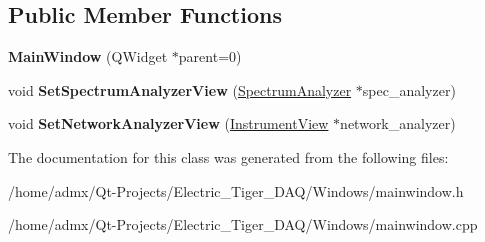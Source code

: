 \subsection*{Public Member Functions}
\begin{DoxyCompactItemize}
\item 
\hypertarget{class_main_window_a8b244be8b7b7db1b08de2a2acb9409db}{{\bfseries Main\+Window} (Q\+Widget $\ast$parent=0)}\label{class_main_window_a8b244be8b7b7db1b08de2a2acb9409db}

\item 
\hypertarget{class_main_window_a682438fcbf5c684e47a6a089477d8a8a}{void {\bfseries Set\+Spectrum\+Analyzer\+View} (\hyperlink{class_spectrum_analyzer}{Spectrum\+Analyzer} $\ast$spec\+\_\+analyzer)}\label{class_main_window_a682438fcbf5c684e47a6a089477d8a8a}

\item 
\hypertarget{class_main_window_aff3b43153f014e8aac712dbeae7eb255}{void {\bfseries Set\+Network\+Analyzer\+View} (\hyperlink{class_instrument_view}{Instrument\+View} $\ast$network\+\_\+analyzer)}\label{class_main_window_aff3b43153f014e8aac712dbeae7eb255}

\end{DoxyCompactItemize}


The documentation for this class was generated from the following files\+:\begin{DoxyCompactItemize}
\item 
/home/admx/\+Qt-\/\+Projects/\+Electric\+\_\+\+Tiger\+\_\+\+D\+A\+Q/\+Windows/mainwindow.\+h\item 
/home/admx/\+Qt-\/\+Projects/\+Electric\+\_\+\+Tiger\+\_\+\+D\+A\+Q/\+Windows/mainwindow.\+cpp\end{DoxyCompactItemize}
